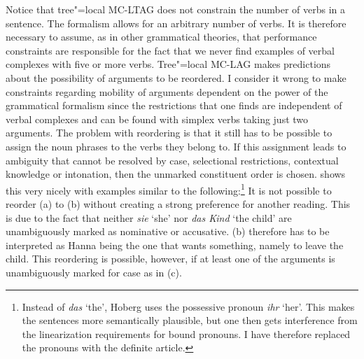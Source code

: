 Notice that tree"=local MC-LTAG does not constrain the number of verbs in a sentence. The formalism allows for an arbitrary number of verbs.
It is therefore necessary to assume, as in other grammatical theories, that performance constraints are responsible for the fact that we never find
examples of verbal complexes with five or more verbs. Tree"=local MC-LAG makes predictions about the possibility of arguments to be reordered.
I consider it wrong to make constraints regarding mobility of arguments dependent on the power of the grammatical formalism since the restrictions that
one finds are independent of verbal complexes and can be found with simplex verbs taking just two arguments.
The problem with reordering is that it still has to be possible to assign the noun phrases to the
verbs they belong to. If this assignment leads to ambiguity
that cannot be resolved by case, selectional restrictions, contextual knowledge or intonation, then the unmarked constituent order is chosen.
\citet*[]{Hoberg81a} shows this very nicely with examples similar to the following:\footnote{        
        Instead of \emph{das} `the', Hoberg uses the possessive pronoun \emph{ihr} `her'.
		This makes the sentences more semantically plausible, but one then gets interference from the
		linearization requirements for bound pronouns. I have therefore replaced the pronouns with the definite article.
}
\eal
\judgewidth{\#}
\zl
It is not possible to reorder (a)  to (b) without creating a strong preference for another reading.
This is due to the fact that neither \emph{sie} `she' nor \emph{das Kind} `the child' are unambiguously marked as
nominative or accusative. (b) therefore has to be interpreted as Hanna being the one that wants something, namely
to leave the child. This reordering is possible, however, if at least one of the arguments is unambiguously marked for case
as in (c).

